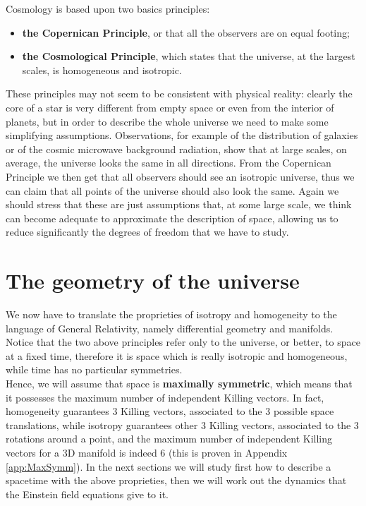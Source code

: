 Cosmology is based upon two basics principles:
\begin{itemize}
    \item \textbf{the Copernican Principle}, or that all the observers are on equal footing;
    \item \textbf{the Cosmological Principle}, which states that the universe, at the largest scales, is homogeneous and isotropic.
\end{itemize}
These principles may not seem to be consistent with physical reality: clearly the core of a star is very different from empty space or even from the interior of planets, but in order to describe the whole universe we need to make some simplifying assumptions. Observations, for example of the distribution of galaxies or of the cosmic microwave background radiation, show that at large scales, on average, the universe looks the same in all directions. From the Copernican Principle we then get that all observers should see an isotropic universe, thus we can claim that all points of the universe should also look the same. Again we should stress that these are just assumptions that, at some large scale, we think can become adequate to approximate the description of space, allowing us to reduce significantly the degrees of freedom that we have to study.
\section{The geometry of the universe}
We now have to translate the proprieties of isotropy and homogeneity to the language of General Relativity, namely differential geometry and manifolds.\\ Notice that the two above principles refer only to the universe, or better, to space at a fixed time, therefore it is space which is really isotropic and homogeneous, while time has no particular symmetries.\\
Hence, we will assume that space is \textbf{maximally symmetric}, which means that it possesses the maximum number of independent Killing vectors. In fact, homogeneity guarantees 3 Killing vectors, associated to the 3 possible space translations, while isotropy guarantees other 3 Killing vectors, associated to the 3 rotations around a point, and the maximum number of independent Killing vectors for a 3D manifold is indeed 6 (this is proven in Appendix \ref{app:MaxSymm}).
In the next sections we will study first how to describe a spacetime with the above proprieties, then we will work out the dynamics that the Einstein field equations give to it.
